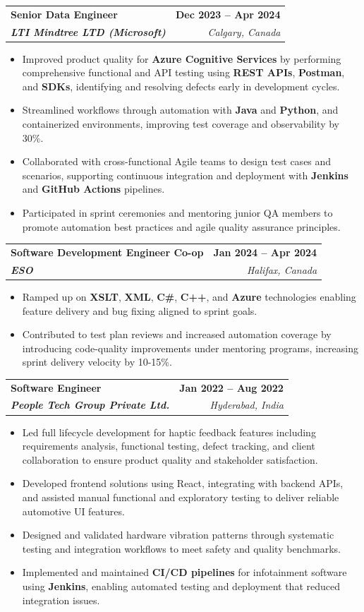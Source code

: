 \documentclass[letterpaper,11pt]{article}
\makeatletter
\newcommand{\resumeItem}[1]{
  \item\small{
    {#1 \vspace{-2pt}}
  }
}
\newcommand{\resumeSubheading}[4]{
  \vspace{-2pt}\item
    \begin{tabular*}{1.0\textwidth}[t]{l@{\extracolsep{\fill}}r}
      \textbf{#1} & \textbf{\small #2} \\
      \textit{\small#3} & \textit{\small #4} \\
    \end{tabular*}\vspace{-7pt}
}
\newcommand{\resumeItemListStart}{\begin{itemize}}
\newcommand{\resumeItemListEnd}{\end{itemize}\vspace{-5pt}}
\makeatother
\begin{document}
    \resumeSubheading
      {\textbf{Senior Data Engineer}}{\textbf{Dec 2023 -- Apr 2024}}
      {\textbf{LTI Mindtree LTD (Microsoft)}}{Calgary, Canada}
      \resumeItemListStart
        \resumeItem{Improved product quality for \textbf{Azure Cognitive Services} by performing comprehensive functional and API testing using \textbf{REST APIs}, \textbf{Postman}, and \textbf{SDKs}, identifying and resolving defects early in development cycles.}
        \resumeItem{Streamlined workflows through automation with \textbf{Java} and \textbf{Python}, and containerized environments, improving test coverage and observability by 30\%.}
        \resumeItem{Collaborated with cross-functional Agile teams to design test cases and scenarios, supporting continuous integration and deployment with \textbf{Jenkins} and \textbf{GitHub Actions} pipelines.}
        \resumeItem{Participated in sprint ceremonies and mentoring junior QA members to promote automation best practices and agile quality assurance principles.}
      \resumeItemListEnd
    
    \resumeSubheading
      {\textbf{Software Development Engineer Co-op}}{\textbf{Jan 2024 -- Apr 2024}}
      {\textbf{ESO}}{Halifax, Canada}
      \resumeItemListStart
        \resumeItem{Ramped up on \textbf{XSLT}, \textbf{XML}, \textbf{C\#}, \textbf{C++}, and \textbf{Azure} technologies enabling feature delivery and bug fixing aligned to sprint goals.}
        \resumeItem{Contributed to test plan reviews and increased automation coverage by introducing code-quality improvements under mentoring programs, increasing sprint delivery velocity by 10-15\%.}
      \resumeItemListEnd

    \resumeSubheading
      {\textbf{Software Engineer}}{\textbf{Jan 2022 -- Aug 2022}}
      {\textbf{People Tech Group Private Ltd.}}{Hyderabad, India}
      \resumeItemListStart
        \resumeItem{Led full lifecycle development for haptic feedback features including requirements analysis, functional testing, defect tracking, and client collaboration to ensure product quality and stakeholder satisfaction.}
        \resumeItem{Developed frontend solutions using React, integrating with backend APIs, and assisted manual functional and exploratory testing to deliver reliable automotive UI features.}
        \resumeItem{Designed and validated hardware vibration patterns through systematic testing and integration workflows to meet safety and quality benchmarks.}
        \resumeItem{Implemented and maintained \textbf{CI/CD pipelines} for infotainment software using \textbf{Jenkins}, enabling automated testing and deployment that reduced integration issues.}
      \resumeItemListEnd
\end{document}
